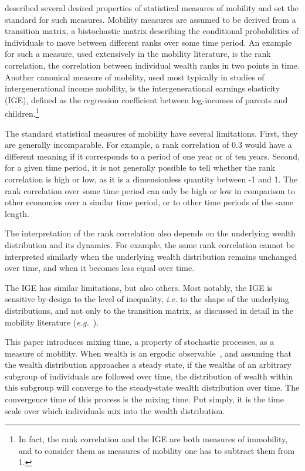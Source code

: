 \documentclass[11pt]{article}
\newcommand{\ie}{{\it i.e.}\xspace}
\newcommand{\eg}{{\it e.g.}\xspace}
\numberwithin{equation}{section}
\begin{document}
\citet{Shorrocks1978} described several desired properties of statistical measures of mobility and set the standard for such measures. Mobility measures are assumed to be derived from a transition matrix, a bistochastic matrix describing the conditional probabilities of individuals to move between different ranks over some time period. An example for such a measure, used extensively in the mobility literature, is the rank correlation, the correlation between individual wealth ranks in two points in time. Another canonical measure of mobility, used most typically in studies of intergenerational income mobility, is the intergenerational earnings elasticity (IGE), defined as the regression coefficient between log-incomes of parents and children.\footnote{In fact, the rank correlation and the IGE are both measures of immobility, and to consider them as measures of mobility one has to subtract them from 1.}

The standard statistical measures of mobility have several limitations. First, they are generally incomparable. For example, a rank correlation of 0.3 would have a different meaning if it corresponds to a period of one year or of ten years. Second, for a given time period, it is not generally possible to tell whether the rank correlation is high or low, as it is a dimensionless quantity between -1 and 1. The rank correlation over some time period can only be high or low in comparison to other economies over a similar time period, or to other time periods of the same length.

The interpretation of the rank correlation also depends on the underlying wealth distribution and its dynamics. For example, the same rank correlation cannot be interpreted similarly when the underlying wealth distribution remains unchanged over time, and when it becomes less equal over time.

The IGE has similar limitations, but also others. Most notably, the IGE is sensitive by-design to the level of inequality, \ie to the shape of the underlying distributions, and not only to the transition matrix, as discussed in detail in the mobility literature (\eg~\citet{chettyETAL2014}).

This paper introduces mixing time, a property of stochastic processes, as a measure of mobility. When wealth is an ergodic observable~\citep{PetersAdamou2018c}, and assuming that the wealth distribution approaches a steady state, if the wealths of an arbitrary subgroup of individuals are followed over time, the distribution of wealth within this subgroup will converge to the steady-state wealth distribution over time. The convergence time of this process is the mixing time. Put simply, it is the time scale over which individuals mix into the wealth distribution.
\end{document}
